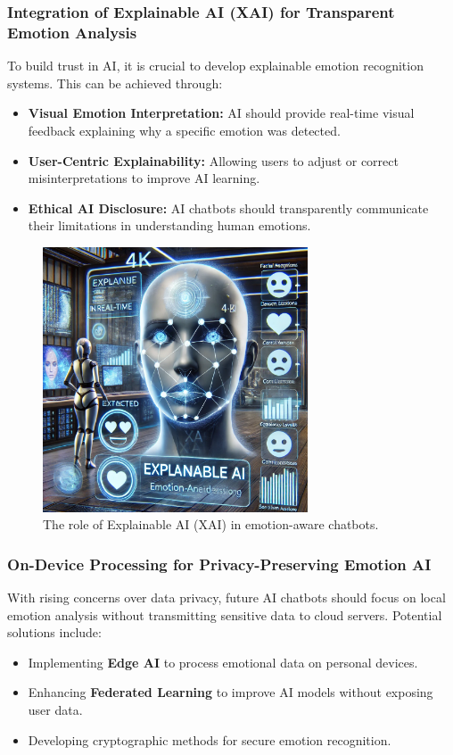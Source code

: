 \documentclass[a4paper,10pt]{article}
\begin{document}
\subsubsection{Integration of Explainable AI (XAI) for Transparent Emotion Analysis}
To build trust in AI, it is crucial to develop explainable emotion recognition systems. This can be achieved through:
\begin{itemize}
    \item \textbf{Visual Emotion Interpretation:} AI should provide real-time visual feedback explaining why a specific emotion was detected.
    \item \textbf{User-Centric Explainability:} Allowing users to adjust or correct misinterpretations to improve AI learning.
    \item \textbf{Ethical AI Disclosure:} AI chatbots should transparently communicate their limitations in understanding human emotions.
\end{itemize}

\begin{figure}[h]
    \centering
    \includegraphics[width=0.7\textwidth]{img-14.png}
    \caption{The role of Explainable AI (XAI) in emotion-aware chatbots.}
    \label{fig:ai_transparency}
\end{figure}

\subsubsection{On-Device Processing for Privacy-Preserving Emotion AI}
With rising concerns over data privacy, future AI chatbots should focus on local emotion analysis without transmitting sensitive data to cloud servers. Potential solutions include:
\begin{itemize}
    \item Implementing \textbf{Edge AI} to process emotional data on personal devices.
    \item Enhancing \textbf{Federated Learning} to improve AI models without exposing user data.
    \item Developing cryptographic methods for secure emotion recognition.
\end{itemize}
\end{document}
